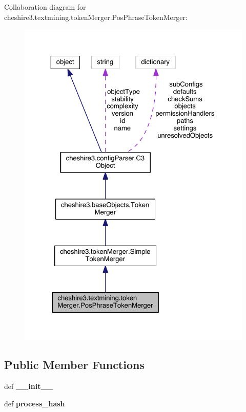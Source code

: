 Collaboration diagram for cheshire3.\-textmining.\-token\-Merger.\-Pos\-Phrase\-Token\-Merger\-:
\nopagebreak
\begin{figure}[H]
\begin{center}
\leavevmode
\includegraphics[width=325pt]{classcheshire3_1_1textmining_1_1token_merger_1_1_pos_phrase_token_merger__coll__graph}
\end{center}
\end{figure}
\subsection*{Public Member Functions}
\begin{DoxyCompactItemize}
\item 
\hypertarget{classcheshire3_1_1textmining_1_1token_merger_1_1_pos_phrase_token_merger_a738fc7ac329a34a6be6a92de35e29eb0}{def {\bfseries \-\_\-\-\_\-init\-\_\-\-\_\-}}\label{classcheshire3_1_1textmining_1_1token_merger_1_1_pos_phrase_token_merger_a738fc7ac329a34a6be6a92de35e29eb0}

\item 
\hypertarget{classcheshire3_1_1textmining_1_1token_merger_1_1_pos_phrase_token_merger_a09a3fcdf8bb0d55303c94e11e9e74acd}{def {\bfseries process\-\_\-hash}}\label{classcheshire3_1_1textmining_1_1token_merger_1_1_pos_phrase_token_merger_a09a3fcdf8bb0d55303c94e11e9e74acd}

\end{DoxyCompactItemize}
